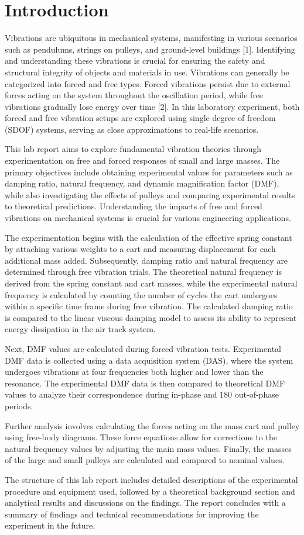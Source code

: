
\section{Introduction}
Vibrations are ubiquitous in mechanical systems, manifesting in various scenarios such as pendulums, strings on pulleys, and ground-level buildings [1]. Identifying and understanding these vibrations is crucial for ensuring the safety and structural integrity of objects and materials in use. Vibrations can generally be categorized into forced and free types. Forced vibrations persist due to external forces acting on the system throughout the oscillation period, while free vibrations gradually lose energy over time [2]. In this laboratory experiment, both forced and free vibration setups are explored using single degree of freedom (SDOF) systems, serving as close approximations to real-life scenarios.

This lab report aims to explore fundamental vibration theories through experimentation on free and forced responses of small and large masses. The primary objectives include obtaining experimental values for parameters such as damping ratio, natural frequency, and dynamic magnification factor (DMF), while also investigating the effects of pulleys and comparing experimental results to theoretical predictions. Understanding the impacts of free and forced vibrations on mechanical systems is crucial for various engineering applications.

The experimentation begins with the calculation of the effective spring constant by attaching various weights to a cart and measuring displacement for each additional mass added. Subsequently, damping ratio and natural frequency are determined through free vibration trials. The theoretical natural frequency is derived from the spring constant and cart masses, while the experimental natural frequency is calculated by counting the number of cycles the cart undergoes within a specific time frame during free vibration. The calculated damping ratio is compared to the linear viscous damping model to assess its ability to represent energy dissipation in the air track system.

Next, DMF values are calculated during forced vibration tests. Experimental DMF data is collected using a data acquisition system (DAS), where the system undergoes vibrations at four frequencies both higher and lower than the resonance. The experimental DMF data is then compared to theoretical DMF values to analyze their correspondence during in-phase and 180 out-of-phase periods.

Further analysis involves calculating the forces acting on the mass cart and pulley using free-body diagrams. These force equations allow for corrections to the natural frequency values by adjusting the main mass values. Finally, the masses of the large and small pulleys are calculated and compared to nominal values.

The structure of this lab report includes detailed descriptions of the experimental procedure and equipment used, followed by a theoretical background section and analytical results and discussions on the findings. The report concludes with a summary of findings and technical recommendations for improving the experiment in the future.